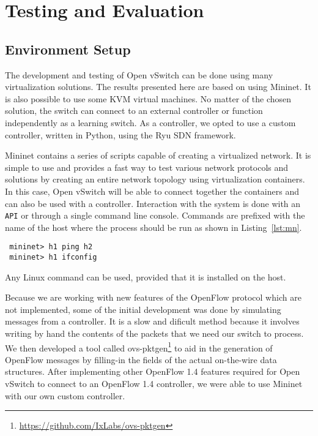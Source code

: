 \chapter{Testing and Evaluation}
\label{chapter:test-eval}

\section{Environment Setup}
\label{section:setup}

The development and testing of Open vSwitch can be done using many virtualization solutions. The
results presented here are based on using Mininet\cite{mn}. It is also possible to use some KVM\cite{kvm}
virtual machines. No matter of the chosen solution, the switch can connect to an
external controller or function independently as a learning switch. As a controller, we opted
to use a custom controller, written in Python, using the Ryu\cite{ryu} SDN framework.

Mininet contains a series of scripts capable of creating a virtualized network. It is simple to
use and provides a fast way to test various network protocols and solutions by creating
an entire network topology using virtualization containers. In this case, Open vSwitch will
be able to connect together the containers and can also be used with a controller.
Interaction with the system is done with an \texttt{API} or through a single command line console.
Commands are prefixed with the name of the host where the process should be run as shown in
Listing~\ref{lst:mn}.
\lstset{caption=Mininet Command Line,label=lst:mn}
\begin{lstlisting}
 mininet> h1 ping h2
 mininet> h1 ifconfig
\end{lstlisting}
Any Linux command can be used, provided that it is installed on the host.

Because we are working with new features of the OpenFlow protocol which are not implemented, some of
the initial development was done by simulating messages from a controller. It is a slow and dificult method
because it involves writing by hand the contents of the packets that we need our switch to process.
We then developed a tool called ovs-pktgen\footnote{\url{https://github.com/IxLabs/ovs-pktgen}}
to aid in the generation of OpenFlow messages by filling-in the fields of the actual on-the-wire
data structures. After implementing other OpenFlow 1.4 features required for Open vSwitch to connect
to an OpenFlow 1.4 controller, we were able to use Mininet with our own custom controller.

